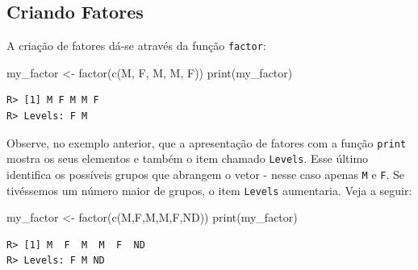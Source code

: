 \documentclass[
  11pt,
]{book}
\newenvironment{Shaded}{\begin{snugshade}}{\end{snugshade}}
\newcommand{\FunctionTok}[1]{\textcolor[rgb]{0,0,0}{#1}}
\newcommand{\NormalTok}[1]{#1}
\newcommand{\OtherTok}[1]{\textcolor[rgb]{0.37,0.37,0.37}{#1}}
\newcommand{\StringTok}[1]{\textcolor[rgb]{0.5,0.5,0.5}{#1}}
\begin{document}
\hypertarget{criando-fatores}{%
\subsection{Criando Fatores}\label{criando-fatores}}

A criação de fatores dá-se através da função \texttt{factor}: 

\begin{Shaded}
\begin{Highlighting}[]
\NormalTok{my\_factor }\OtherTok{\textless{}{-}} \FunctionTok{factor}\NormalTok{(}\FunctionTok{c}\NormalTok{(}\StringTok{\textquotesingle{}M\textquotesingle{}}\NormalTok{, }\StringTok{\textquotesingle{}F\textquotesingle{}}\NormalTok{, }\StringTok{\textquotesingle{}M\textquotesingle{}}\NormalTok{, }\StringTok{\textquotesingle{}M\textquotesingle{}}\NormalTok{, }\StringTok{\textquotesingle{}F\textquotesingle{}}\NormalTok{))}
\FunctionTok{print}\NormalTok{(my\_factor)}
\end{Highlighting}
\end{Shaded}

\begin{verbatim}
R> [1] M F M M F
R> Levels: F M
\end{verbatim}

Observe, no exemplo anterior, que a apresentação de fatores com a função \texttt{print} mostra os seus elementos e também o item chamado \texttt{Levels}. Esse último identifica os possíveis grupos que abrangem o vetor - nesse caso apenas \texttt{M} e \texttt{F}. Se tivéssemos um número maior de grupos, o item \texttt{Levels} aumentaria. Veja a seguir:

\begin{Shaded}
\begin{Highlighting}[]
\NormalTok{my\_factor }\OtherTok{\textless{}{-}} \FunctionTok{factor}\NormalTok{(}\FunctionTok{c}\NormalTok{(}\StringTok{\textquotesingle{}M\textquotesingle{}}\NormalTok{,}\StringTok{\textquotesingle{}F\textquotesingle{}}\NormalTok{,}\StringTok{\textquotesingle{}M\textquotesingle{}}\NormalTok{,}\StringTok{\textquotesingle{}M\textquotesingle{}}\NormalTok{,}\StringTok{\textquotesingle{}F\textquotesingle{}}\NormalTok{,}\StringTok{\textquotesingle{}ND\textquotesingle{}}\NormalTok{))}
\FunctionTok{print}\NormalTok{(my\_factor)}
\end{Highlighting}
\end{Shaded}

\begin{verbatim}
R> [1] M  F  M  M  F  ND
R> Levels: F M ND
\end{verbatim}
\end{document}

